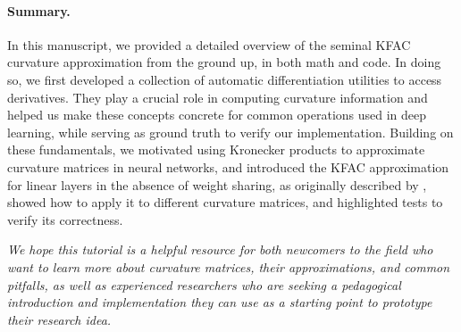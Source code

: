 \paragraph{Summary.} In this manuscript, we provided a detailed overview of the seminal KFAC curvature approximation from the ground up, in both math and code.
In doing so, we first developed a collection of automatic differentiation utilities to access derivatives.
They play a crucial role in computing curvature information and helped us make these concepts concrete for common operations used in deep learning, while serving as ground truth to verify our implementation.
Building on these fundamentals, we motivated using Kronecker products to approximate curvature matrices in neural networks, and introduced the KFAC approximation for linear layers in the absence of weight sharing, as originally described by \citet{martens2015optimizing}, showed how to apply it to different curvature matrices, and highlighted tests to verify its correctness.

\emph{We hope this tutorial is a helpful resource for both newcomers to the field who want to learn more about curvature matrices, their approximations, and common pitfalls, as well as experienced researchers who are seeking a pedagogical introduction and implementation they can use as a starting point to prototype their research idea.}

